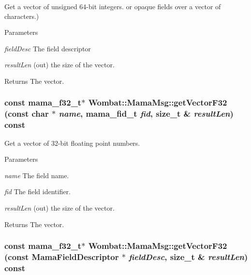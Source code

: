Get a vector of unsigned 64-\/bit integers. or opaque fields over a vector of characters.) 
\begin{DoxyParams}{Parameters}
\item[{\em fieldDesc}]The field descriptor \item[{\em resultLen}](out) the size of the vector. \end{DoxyParams}
\begin{DoxyReturn}{Returns}
The vector. 
\end{DoxyReturn}
\hypertarget{classWombat_1_1MamaMsg_ac6175d558ea979d95d567935b2b3b9ec}{
\subsubsection[{getVectorF32}]{\setlength{\rightskip}{0pt plus 5cm}const mama\_\-f32\_\-t$\ast$ Wombat::MamaMsg::getVectorF32 (const char $\ast$ {\em name}, \/  mama\_\-fid\_\-t {\em fid}, \/  size\_\-t \& {\em resultLen}) const}}
\label{classWombat_1_1MamaMsg_ac6175d558ea979d95d567935b2b3b9ec}


Get a vector of 32-\/bit floating point numbers. 
\begin{DoxyParams}{Parameters}
\item[{\em name}]The field name. \item[{\em fid}]The field identifier. \item[{\em resultLen}](out) the size of the vector. \end{DoxyParams}
\begin{DoxyReturn}{Returns}
The vector. 
\end{DoxyReturn}
\hypertarget{classWombat_1_1MamaMsg_aa0069bf80c0f5dedb599f089c04baf35}{
\subsubsection[{getVectorF32}]{\setlength{\rightskip}{0pt plus 5cm}const mama\_\-f32\_\-t$\ast$ Wombat::MamaMsg::getVectorF32 (const {\bf MamaFieldDescriptor} $\ast$ {\em fieldDesc}, \/  size\_\-t \& {\em resultLen}) const}}
\label{classWombat_1_1MamaMsg_aa0069bf80c0f5dedb599f089c04baf35}


